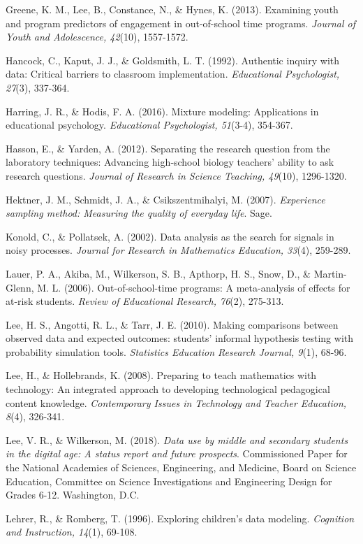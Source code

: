 \documentclass[]{msu-thesis}
\theoremstyle{definition}
\theoremstyle{definition}
\theoremstyle{definition}
\theoremstyle{remark}
\begin{document}
Greene, K. M., Lee, B., Constance, N., \& Hynes, K. (2013). Examining
youth and program predictors of engagement in out-of-school time
programs. \emph{Journal of Youth and Adolescence, 42}(10), 1557-1572.

Hancock, C., Kaput, J. J., \& Goldsmith, L. T. (1992). Authentic inquiry
with data: Critical barriers to classroom implementation.
\emph{Educational Psychologist, 27}(3), 337-364.

Harring, J. R., \& Hodis, F. A. (2016). Mixture modeling: Applications
in educational psychology. \emph{Educational Psychologist, 51}(3-4),
354-367.

Hasson, E., \& Yarden, A. (2012). Separating the research question from
the laboratory techniques: Advancing high‐school biology teachers'
ability to ask research questions. \emph{Journal of Research in Science
Teaching, 49}(10), 1296-1320.

Hektner, J. M., Schmidt, J. A., \& Csikszentmihalyi, M. (2007).
\emph{Experience sampling method: Measuring the quality of everyday
life}. Sage.

Konold, C., \& Pollatsek, A. (2002). Data analysis as the search for
signals in noisy processes. \emph{Journal for Research in Mathematics
Education, 33}(4), 259-289.

Lauer, P. A., Akiba, M., Wilkerson, S. B., Apthorp, H. S., Snow, D., \&
Martin-Glenn, M. L. (2006). Out-of-school-time programs: A meta-analysis
of effects for at-risk students. \emph{Review of Educational Research,
76}(2), 275-313.

Lee, H. S., Angotti, R. L., \& Tarr, J. E. (2010). Making comparisons
between observed data and expected outcomes: students' informal
hypothesis testing with probability simulation tools. \emph{Statistics
Education Research Journal, 9}(1), 68-96.

Lee, H., \& Hollebrands, K. (2008). Preparing to teach mathematics with
technology: An integrated approach to developing technological
pedagogical content knowledge. \emph{Contemporary Issues in Technology
and Teacher Education, 8}(4), 326-341.

Lee, V. R., \& Wilkerson, M. (2018). \emph{Data use by middle and
secondary students in the digital age: A status report and future
prospects}. Commissioned Paper for the National Academies of Sciences,
Engineering, and Medicine, Board on Science Education, Committee on
Science Investigations and Engineering Design for Grades 6-12.
Washington, D.C.

Lehrer, R., \& Romberg, T. (1996). Exploring children's data modeling.
\emph{Cognition and Instruction, 14}(1), 69-108.
\end{document}
